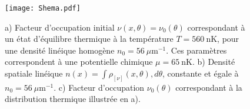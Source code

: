 




\begin{figure}[!htb]
	\centering
	\texttt{[image: Shema.pdf]}	
	\caption{a) Facteur d’occupation initial $\nu(x, \theta) = \nu_0(\theta)$ correspondant à un état d’équilibre thermique à la température $T = 560~\mathrm{nK}$, pour une densité linéique homogène $n_0 = 56~\mu\mathrm{m}^{-1}$. Ces paramètres correspondent à une potentielle chimique $\mu = 65~\mathrm{nK}$.
b) Densité spatiale linéique $n(x) = \int \rho_{[\nu]}(x, \theta), d\theta$, constante et égale à $n_0 = 56~\mu\mathrm{m}^{-1}$.
c) Facteur d’occupation $\nu_0(\theta)$ correspondant à la distribution thermique illustrée en a).}
	\label{fig:BiPart.insitut}
\end{figure}


